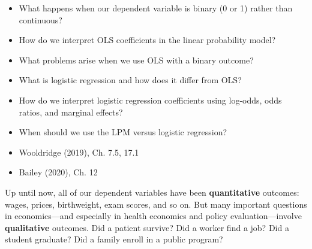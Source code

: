 \documentclass[
  letterpaper,
  DIV=11,
  numbers=noendperiod]{scrreprt}
\providecommand{\tightlist}{%
  \setlength{\itemsep}{0pt}\setlength{\parskip}{0pt}}
\begin{document}
\begin{tcolorbox}[enhanced jigsaw, arc=.35mm, bottomrule=.15mm, bottomtitle=1mm, breakable, colback=white, colbacktitle=quarto-callout-tip-color!10!white, colframe=quarto-callout-tip-color-frame, coltitle=black, left=2mm, leftrule=.75mm, opacityback=0, opacitybacktitle=0.6, rightrule=.15mm, title=\textcolor{quarto-callout-tip-color}{\faLightbulb}\hspace{0.5em}{\textbf{Key Questions}}, titlerule=0mm, toprule=.15mm, toptitle=1mm]

\begin{itemize}
\tightlist
\item
  What happens when our dependent variable is binary (0 or 1) rather
  than continuous?
\item
  How do we interpret OLS coefficients in the linear probability model?
\item
  What problems arise when we use OLS with a binary outcome?
\item
  What is logistic regression and how does it differ from OLS?
\item
  How do we interpret logistic regression coefficients using log-odds,
  odds ratios, and marginal effects?
\item
  When should we use the LPM versus logistic regression?
\end{itemize}

\end{tcolorbox}

\begin{tcolorbox}[enhanced jigsaw, arc=.35mm, bottomrule=.15mm, bottomtitle=1mm, breakable, colback=white, colbacktitle=quarto-callout-note-color!10!white, colframe=quarto-callout-note-color-frame, coltitle=black, left=2mm, leftrule=.75mm, opacityback=0, opacitybacktitle=0.6, rightrule=.15mm, title=\textcolor{quarto-callout-note-color}{\faInfo}\hspace{0.5em}{\textbf{Suggested Readings}}, titlerule=0mm, toprule=.15mm, toptitle=1mm]

\begin{itemize}
\tightlist
\item
  Wooldridge (2019), Ch. 7.5, 17.1
\item
  Bailey (2020), Ch. 12
\end{itemize}

\end{tcolorbox}

Up until now, all of our dependent variables have been
\textbf{quantitative} outcomes: wages, prices, birthweight, exam scores,
and so on. But many important questions in economics---and especially in
health economics and policy evaluation---involve \textbf{qualitative}
outcomes. Did a patient survive? Did a worker find a job? Did a student
graduate? Did a family enroll in a public program?
\end{document}
